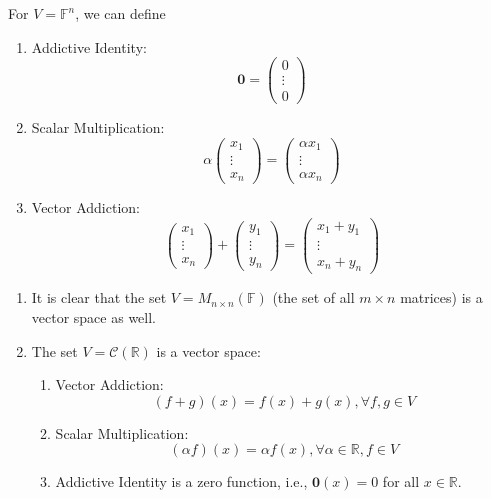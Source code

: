 \begin{example}
For $V=\mathbb{F}^n$, we can define
\begin{enumerate}
\item
Addictive Identity:
\[
\bm0=\begin{pmatrix}
0\\\vdots\\0
\end{pmatrix}
\]
\item
Scalar Multiplication:
\[
\alpha\begin{pmatrix}
x_1\\\vdots\\x_n
\end{pmatrix}=
\begin{pmatrix}
\alpha x_1\\\vdots\\\alpha x_n
\end{pmatrix}
\]
\item
Vector Addiction:
\[
\begin{pmatrix}
x_1\\\vdots\\x_n
\end{pmatrix}
+
\begin{pmatrix}
y_1\\\vdots\\y_n
\end{pmatrix}
=
\begin{pmatrix}
x_1+y_1\\\vdots\\x_n+y_n
\end{pmatrix}
\]
\end{enumerate}
\end{example}
\begin{example}
\begin{enumerate}
\item
It is clear that the set $V=M_{n\times n}(\mathbb{F})$ (the set of all $m\times n$ matrices) is a vector space as well.
\item
The set $V=\mathcal{C}(\mathbb{R})$ is a vector space:
\begin{enumerate}
\item
Vector Addiction:
\[
(f+g)(x)=f(x)+g(x),\forall f,g\in V
\]
\item
Scalar Multiplication:
\[
(\alpha f)(x)=\alpha f(x),\forall\alpha\in\mathbb{R},f\in V
\]
\item
Addictive Identity is a zero function, i.e., $\bm0(x)=0$ for all $x\in\mathbb{R}$.
\end{enumerate}
\end{enumerate}
\end{example}

